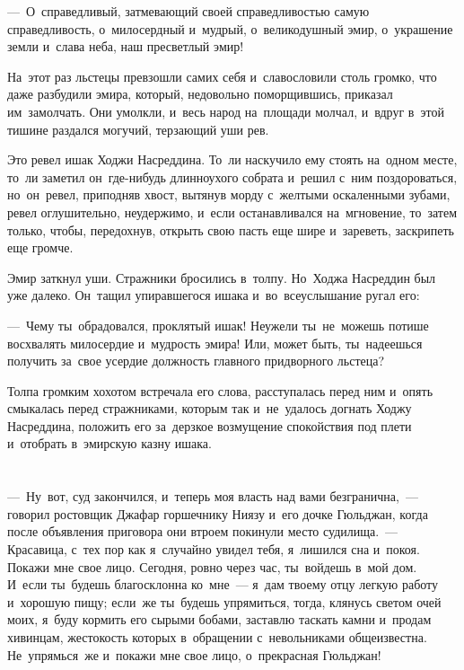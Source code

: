 \documentclass[12pt,a4paper]{book}
\begin{document}
—~О~справедливый, затмевающий своей справедливостью самую справедливость, о~милосердный и~мудрый, о~великодушный эмир, о~украшение земли и~слава неба, наш пресветлый эмир!

На~этот раз льстецы превзошли самих себя и~славословили столь громко, что даже разбудили эмира, который, недовольно поморщившись, приказал им~замолчать. Они умолкли, и~весь народ на~площади молчал, и~вдруг в~этой тишине раздался могучий, терзающий уши рев.

Это ревел ишак Ходжи Насреддина. То~ли наскучило ему стоять на~одном месте, то~ли заметил он~где-нибудь длинноухого собрата и~решил с~ним поздороваться, но~он~ревел, приподняв хвост, вытянув морду с~желтыми оскаленными зубами, ревел оглушительно, неудержимо, и~если останавливался на~мгновение, то~затем только, чтобы, передохнув, открыть свою пасть еще шире и~зареветь, заскрипеть еще громче.

Эмир заткнул уши. Стражники бросились в~толпу. Но~Ходжа Насреддин был уже далеко. Он~тащил упиравшегося ишака и~во~всеуслышание ругал его:

—~Чему ты~обрадовался, проклятый ишак! Неужели ты~не~можешь потише восхвалять милосердие и~мудрость эмира! Или, может быть, ты~надеешься получить за~свое усердие должность главного придворного льстеца?

Толпа громким хохотом встречала его слова, расступалась перед ним и~опять смыкалась перед стражниками, которым так и~не~удалось догнать Ходжу Насреддина, положить его за~дерзкое возмущение спокойствия под плети и~отобрать в~эмирскую казну ишака.


\chapter{}

—~Ну~вот, суд закончился, и~теперь моя власть над вами безгранична,~— говорил ростовщик Джафар горшечнику Ниязу и~его дочке Гюльджан, когда после объявления приговора они втроем покинули место судилища.~— Красавица, с~тех пор как я~случайно увидел тебя, я~лишился сна и~покоя. Покажи мне свое лицо. Сегодня, ровно через час, ты~войдешь в~мой дом. И~если ты~будешь благосклонна ко~мне~— я~дам твоему отцу легкую работу и~хорошую пищу; если~же ты~будешь упрямиться, тогда, клянусь светом очей моих, я~буду кормить его сырыми бобами, заставлю таскать камни и~продам хивинцам, жестокость которых в~обращении с~невольниками общеизвестна. Не~упрямься~же и~покажи мне свое лицо, о~прекрасная Гюльджан!
\end{document}

